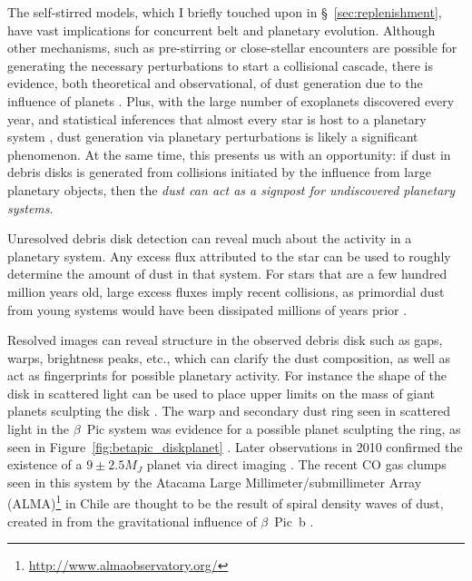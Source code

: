     The self-stirred models, which I briefly touched upon in \S~\ref{sec:replenishment}, have vast implications for concurrent belt and planetary evolution. Although other mechanisms, such as pre-stirring or close-stellar encounters are possible for generating the necessary perturbations to start a collisional cascade, there is evidence, both theoretical and observational, of dust generation due to the influence of planets \citep[e.g., the HD~141569 system,][]{Wyatt2005}. Plus, with the large number of exoplanets discovered every year, and statistical inferences that almost every star is host to a planetary system \citep{Cassan2012}, dust generation via planetary perturbations is likely a significant phenomenon. At the same time, this presents us with an opportunity: if dust in debris disks is generated from collisions initiated by the influence from large planetary objects, then the \textit{dust can act as a signpost for undiscovered planetary systems}.
    
    Unresolved debris disk detection can reveal much about the activity in a planetary system. Any excess flux attributed to the star can be used to roughly determine the amount of dust in that system. For stars that are a few hundred million years old, large excess fluxes imply recent collisions, as primordial dust from young systems would have been dissipated millions of years prior \citep[e.g., BD+20 307,][]{Song2005}.  

    Resolved images can reveal structure in the observed debris disk such as gaps, warps, brightness peaks, etc., which can clarify the dust composition, as well as act as fingerprints for possible planetary activity. For instance the shape of the disk in scattered light can be used to place upper limits on the mass of giant planets sculpting the disk \citet{Rodigas2014}. The warp and secondary dust ring seen in scattered light in the $\beta$~Pic system was evidence for a possible planet sculpting the ring, as seen in Figure~\ref{fig:betapic_diskplanet} \citep{Heap2000}. Later observations in 2010 confirmed the existence of a $9\pm2.5 M_J$ planet via direct imaging \citep{Lagrange2010, Marleau2014}. The recent CO gas clumps seen in this system by the Atacama Large Millimeter/submillimeter Array (ALMA)\footnote{\url{http://www.almaobservatory.org/}} in Chile are thought to be the result of spiral density waves of dust, created in from the gravitational influence of $\beta$~Pic~b \citep{Nesvold2015}. 

